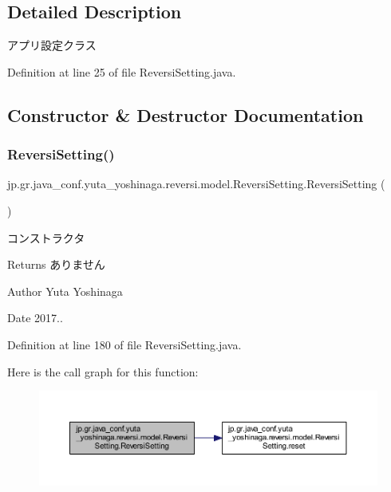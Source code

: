\subsection{Detailed Description}
アプリ設定クラス 

Definition at line 25 of file Reversi\+Setting.\+java.



\subsection{Constructor \& Destructor Documentation}
\mbox{\label{classjp_1_1gr_1_1java__conf_1_1yuta__yoshinaga_1_1reversi_1_1model_1_1_reversi_setting_a0e2fd0216ad010dbbc9112297a6c29c4}} 
\subsubsection{\texorpdfstring{Reversi\+Setting()}{ReversiSetting()}}
{\footnotesize\ttfamily jp.\+gr.\+java\+\_\+conf.\+yuta\+\_\+yoshinaga.\+reversi.\+model.\+Reversi\+Setting.\+Reversi\+Setting (\begin{DoxyParamCaption}{ }\end{DoxyParamCaption})}



コンストラクタ 

\begin{DoxyReturn}{Returns}
ありません 
\end{DoxyReturn}
\begin{DoxyAuthor}{Author}
Yuta Yoshinaga 
\end{DoxyAuthor}
\begin{DoxyDate}{Date}
2017.. 
\end{DoxyDate}


Definition at line 180 of file Reversi\+Setting.\+java.

Here is the call graph for this function\+:\nopagebreak
\begin{figure}[H]
\begin{center}
\leavevmode
\includegraphics[width=350pt]{classjp_1_1gr_1_1java__conf_1_1yuta__yoshinaga_1_1reversi_1_1model_1_1_reversi_setting_a0e2fd0216ad010dbbc9112297a6c29c4_cgraph}
\end{center}
\end{figure}


